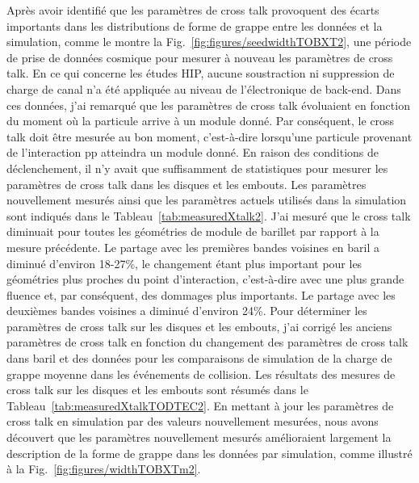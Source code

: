 Après avoir identifié que les paramètres de cross talk provoquent des écarts importants dans les distributions de forme de grappe entre les données et la simulation, comme le montre la Fig.~\ref{fig:figures/seedwidthTOBXT2}, une période de prise de données cosmique pour mesurer à nouveau les paramètres de cross talk. En ce qui concerne les études HIP, aucune soustraction ni suppression de charge de canal n’a été appliquée au niveau de l’électronique de back-end. Dans ces données, j'ai remarqué que les paramètres de cross talk évoluaient en fonction du moment où la particule arrive à un module donné. Par conséquent, le cross talk doit être mesurée au bon moment, c'est-à-dire lorsqu'une particule provenant de l'interaction pp atteindra un module donné. En raison des conditions de déclenchement, il n'y avait que suffisamment de statistiques pour mesurer les paramètres de cross talk dans les disques et les embouts. Les paramètres nouvellement mesurés ainsi que les paramètres actuels utilisés dans la simulation sont indiqués dans le Tableau~\ref{tab:measuredXtalk2}. J'ai mesuré que le cross talk diminuait pour toutes les géométries de module de barillet par rapport à la mesure précédente. Le partage avec les premières bandes voisines en baril a diminué d'environ 18-27\%, le changement étant plus important pour les géométries plus proches du point d'interaction, c'est-à-dire avec une plus grande fluence et, par conséquent, des dommages plus importants. Le partage avec les deuxièmes bandes voisines a diminué d'environ 24\%. Pour déterminer les paramètres de cross talk sur les disques et les embouts, j'ai corrigé les anciens paramètres de cross talk en fonction du changement des paramètres de cross talk dans baril et des données pour les comparaisons de simulation de la charge de grappe moyenne dans les événements de collision. Les résultats des mesures de cross talk sur les disques et les embouts sont résumés dans le Tableau~\ref{tab:measuredXtalkTODTEC2}. En mettant à jour les paramètres de cross talk en simulation par des valeurs nouvellement mesurées, nous avons découvert que les paramètres nouvellement mesurés amélioraient largement la description de la forme de grappe dans les données par simulation, comme illustré à la Fig.~\ref{fig:figures/widthTOBXTm2}.

